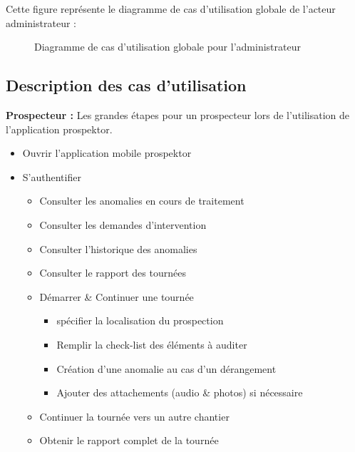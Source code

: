 Cette figure repr\'esente le diagramme de cas d'utilisation globale de l'acteur administrateur :
\begin{figure}[H]
	\caption{\label{fig:my-label} Diagramme de cas d'utilisation globale pour l'administrateur}
\end{figure}

\subsection{Description des cas d'utilisation}
\textbf{Prospecteur :} Les grandes \'etapes pour un prospecteur lors de l'utilisation de l'application prospektor.
\begin{itemize}
  \item Ouvrir l'application mobile prospektor
  \item S'authentifier
  \begin{itemize}
    \item Consulter les anomalies en cours de traitement
    \item Consulter les demandes d'intervention
    \item Consulter l'historique des anomalies
    \item Consulter le rapport des tourn\'ees
    \item D\'emarrer \& Continuer une tourn\'ee
    \begin{itemize}
      \item sp\'ecifier la localisation du prospection
      \item Remplir la check-list des \'el\'ements \`a auditer
      \item Cr\'eation d'une anomalie au cas d'un d\'erangement
      \item Ajouter des attachements (audio \& photos) si n\'ecessaire
    \end{itemize}
    \item Continuer la tourn\'ee vers un autre chantier
    \item Obtenir le rapport complet de la tourn\'ee 
  \end{itemize}
\end{itemize}

